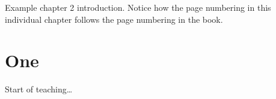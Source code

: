 \documentclass[book]{subfiles}
\begin{document}
\makefrontpages
\introduction
Example chapter 2 introduction. Notice how the page numbering in this individual chapter follows the page numbering in the book.
\section{One}
Start of teaching\ldots
\printexercisesolutions
\printindex
\end{document}
